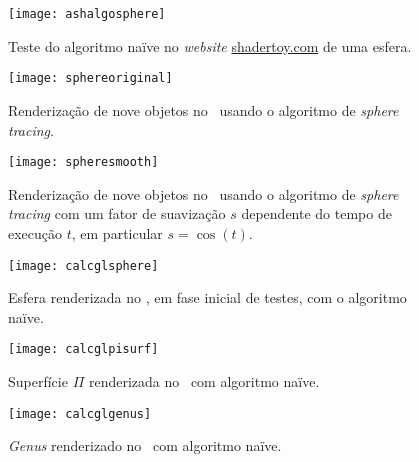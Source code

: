 \begin{figure}[!htbp]
	\centering
	\texttt{[image: ashalgosphere]}
	\caption[Teste do algoritmo naïve]{Teste do algoritmo naïve no \textit{website} \url{shadertoy.com} de uma esfera.}
	\label{fig::ashalgosphere}
\end{figure}

\begin{figure}[!htbp]
	\centering
	\texttt{[image: sphereoriginal]}
	\caption[Nove objetos com \textit{sphere tracing} no \theapp]{Renderização de nove objetos no \theapp~usando o algoritmo de \textit{sphere tracing}.}
	\label{fig::sphereoriginal}
\end{figure}

\begin{figure}[!htbp]
	\centering
	\texttt{[image: spheresmooth]}
	\caption[Nove objetos com \textit{sphere tracing} e suavização no \theapp]{Renderização de nove objetos no \theapp~usando o algoritmo de \textit{sphere tracing} com um fator de suavização $s$ dependente do tempo de execução $t$, em particular $s = \cos(t)$.}
	\label{fig::spheresmooth}
\end{figure}

\begin{figure}[!htbp]
	\centering
	\texttt{[image: calcglsphere]}
	\caption[Esfera no \theapp~com algoritmo naïve]{Esfera renderizada no \theapp, em fase inicial de testes, com o algoritmo naïve.}
	\label{fig::calcglsphere}
\end{figure}

\begin{figure}[!htbp]
	\centering
	\texttt{[image: calcglpisurf]}
	\caption[Superfície $\Pi$ no \theapp~com algoritmo naïve]{Superfície $\Pi$ renderizada no \theapp~com algoritmo naïve.}
	\label{fig::calcglpisurf}
\end{figure}

\begin{figure}[!htbp]
	\centering
	\texttt{[image: calcglgenus]}
	\caption[\textit{Genus} no \theapp~com algoritmo naïve]{\textit{Genus} renderizado no \theapp~com algoritmo naïve.}
	\label{fig::calcglgenus}
\end{figure}


